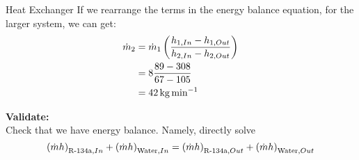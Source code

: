 \begin{example}{Heat Exchanger}
  If we rearrange the terms in the energy balance equation, for the larger system, we can get:
  \begin{align*}
    \dot{m}_{2} &= \dot{m}_{1} \left( \frac{h_{1, In} - h_{1, Out}}{h_{2, In} - h_{2, Out}} \right) \\
                         &= 8 \frac{89 - 308}{67 - 105} \\
                         &= \SI{42}{\kilo\gram\per\minute}
  \end{align*}

  \textbf{Validate:} \\
  Check that we have energy balance.
  Namely, directly solve
  \begin{equation*}
    {(\ensuremath{\dot{m}} \ensuremath{h})}_{\text{R-134a}, In} + {(\dot{m} h)}_{\text{Water}, In} = {(\dot{m} h)}_{\text{R-134a}, Out} + {(\dot{m} h)}_{\text{Water}, Out}
  \end{equation*}
\end{example}

